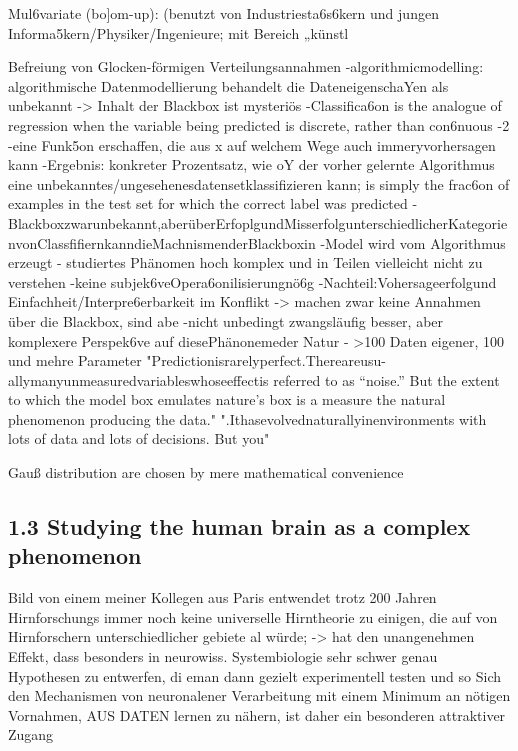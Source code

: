 \documentclass[authoryear,review,3p]{elsarticle}
\begin{document}
Mul6variate (bo]om-up): (benutzt von Industriesta6s6kern und jungen Informa5kern/Physiker/Ingenieure; mit Bereich „künstl

Befreiung von Glocken-förmigen Verteilungsannahmen
-algorithmicmodelling: algorithmische Datenmodellierung behandelt die DateneigenschaYen als unbekannt -> Inhalt der Blackbox ist mysteriös
-Classifica6on is the analogue of regression when the variable being predicted is discrete, rather than con6nuous
-2%
-eine Funk5on erschaffen, die aus x auf welchem Wege auch immeryvorhersagen kann
-Ergebnis: konkreter Prozentsatz, wie oY der vorher gelernte Algorithmus eine unbekanntes/ungesehenesdatensetklassifizieren kann; is simply the frac6on of examples in the test set for which the correct label was predicted -Blackboxzwarunbekannt,aberüberErfoplgundMisserfolgunterschiedlicherKategorienvonClassfifiernkanndieMachnismenderBlackboxin -Model wird vom Algorithmus erzeugt
- studiertes Phänomen hoch komplex und in Teilen vielleicht nicht zu verstehen
-keine subjek6veOpera6onilisierungnö6g
-Nachteil:Vohersageerfolgund Einfachheit/Interpre6erbarkeit im Konflikt -> machen zwar keine Annahmen über die Blackbox, sind abe -nicht unbedingt zwangsläufig besser, aber komplexere Perspek6ve auf diesePhänonemeder Natur
- >100 Daten eigener, 100 und mehre Parameter
"Predictionisrarelyperfect.Thereareusu- allymanyunmeasuredvariableswhoseeffectis referred to as “noise.” But the extent to which the model box emulates nature’s box is a measure the natural phenomenon producing the data."
".Ithasevolvednaturallyinenvironments with lots of data and lots of decisions. But you"


Gauß distribution are chosen by mere mathematical convenience





\subsection*{1.3 Studying the human brain as a complex phenomenon}


Bild von einem meiner Kollegen aus Paris entwendet
trotz 200 Jahren Hirnforschungs immer noch keine universelle Hirntheorie zu einigen, die auf von Hirnforschern unterschiedlicher gebiete al würde;
-> hat den unangenehmen Effekt, dass besonders in neurowiss. Systembiologie sehr schwer genau Hypothesen zu entwerfen, di eman dann gezielt experimentell testen und so
Sich den Mechanismen von neuronalener Verarbeitung mit einem Minimum an nötigen Vornahmen, AUS DATEN lernen zu nähern, ist daher ein besonderen attraktiver Zugang
\end{document}
